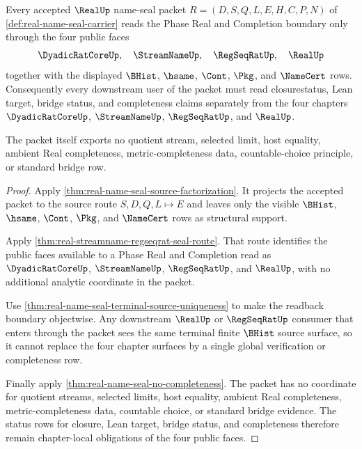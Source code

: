 \begin{theorem}
\label{thm:real-name-seal-open-phase-status-readback}
Every accepted $\RealUp$ name-seal packet $R=(D,S,Q,L,E,H,C,P,N)$ of \autoref{def:real-name-seal-carrier} reads the Phase Real and Completion boundary only through the four public faces
$$
\DyadicRatCoreUp,\quad \StreamNameUp,\quad \RegSeqRatUp,\quad \RealUp
$$
together with the displayed $\BHist$, $\hsame$, $\Cont$, $\Pkg$, and $\NameCert$ rows. Consequently every downstream user of the packet must read closurestatus, Lean target, bridge status, and completeness claims separately from the four chapters $\DyadicRatCoreUp$, $\StreamNameUp$, $\RegSeqRatUp$, and $\RealUp$.

The packet itself exports no quotient stream, selected limit, host equality, ambient Real completeness, metric-completeness data, countable-choice principle, or standard bridge row.
\end{theorem}
\begin{proof}
Apply \autoref{thm:real-name-seal-source-factorization}. It projects the accepted packet to the source route $S,D,Q,L \longmapsto E$ and leaves only the visible $\BHist$, $\hsame$, $\Cont$, $\Pkg$, and $\NameCert$ rows as structural support.

Apply \autoref{thm:real-streamname-regseqrat-seal-route}. That route identifies the public faces available to a Phase Real and Completion read as $\DyadicRatCoreUp$, $\StreamNameUp$, $\RegSeqRatUp$, and $\RealUp$, with no additional analytic coordinate in the packet.

Use \autoref{thm:real-name-seal-terminal-source-uniqueness} to make the readback boundary objectwise. Any downstream $\RealUp$ or $\RegSeqRatUp$ consumer that enters through the packet sees the same terminal finite $\BHist$ source surface, so it cannot replace the four chapter surfaces by a single global verification or completeness row.

Finally apply \autoref{thm:real-name-seal-no-completeness}. The packet has no coordinate for quotient streams, selected limits, host equality, ambient Real completeness, metric-completeness data, countable choice, or standard bridge evidence. The status rows for closure, Lean target, bridge status, and completeness therefore remain chapter-local obligations of the four public faces.
\end{proof}


